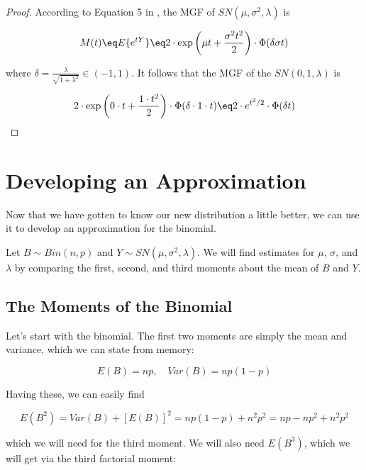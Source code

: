 \documentclass{article}
\begin{document}
\begin{proof}
  According to Equation 5 in \citet{azzalini}, the MGF of $SN(\mu, \sigma^2,
  \lambda)$ is

  \begin{equation*}
    M(t) \eq E\{e^{tY}\} \eq 2 \cdot \exp \left( \mu t + \frac{\sigma^2 t^2}{2} \right) \cdot \Phi(\delta \sigma t)
  \end{equation*}

  where $\delta = \frac{\lambda}{\sqrt{1 + \lambda^2}} \in (-1, 1)$. It follows
  that the MGF of the $SN(0, 1, \lambda)$ is

  \begin{equation*}
    2 \cdot \exp \left( 0 \cdot t + \frac{1 \cdot t^2}{2} \right) \cdot \Phi(\delta \cdot 1 \cdot t) \eq 2 \cdot e^{t^2/2} \cdot \Phi(\delta t)
  \end{equation*}
\end{proof}

\section{Developing an Approximation}

Now that we have gotten to know our new distribution a little better, we can
use it to develop an approximation for the binomial.

Let $B \sim Bin(n, p)$ and $Y \sim SN(\mu, \sigma^2, \lambda)$. We will find
estimates for $\mu$, $\sigma$, and $\lambda$ by comparing the first, second,
and third moments about the mean of $B$ and $Y$.

\subsection{The Moments of the Binomial}

Let's start with the binomial. The first two moments are simply the mean and
variance, which we can state from memory:

\begin{equation*}
  E(B) = np, \quad Var(B) = np(1-p)
\end{equation*}

Having these, we can easily find

\begin{equation*}
  E(B^2) = Var(B) + [E(B)]^2 = np(1-p) + n^2p^2 = np - np^2 + n^2p^2
\end{equation*}

which we will need for the third moment. We will also need $E(B^3)$, which we
will get via the third factorial moment:
\end{document}
